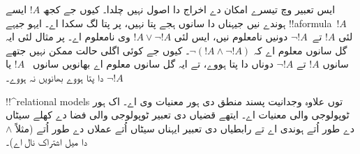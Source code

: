 \documentclass[../../../include/open-logic-section]{subfiles}
\begin{document}
ایس تعبیر وچ تیسرے امکان دے اخراج دا اصول نہیں چلدا۔ کیوں جے کجھ $!A$ ایسے
ہوندے نیں جیہناں دا سانوں ہجے پتا نہیں، پر پتا لگ سکدا اے۔ ایہو جیہے
!!a{formula}~$!A$ لئی $!A$ تے~$\lnot !A$ دونیں نامعلوم نیں، ایس لئی
$!A \lor \lnot !A$ وی نامعلوم اے۔ پر مثال لئی ایہ گل سانوں معلوم اے کہ
$\lnot(!A \land \lnot !A)$۔ کیوں جے کوئی اگلی حالت ممکن نہیں جتھے سانوں
$!A$ تے $\lnot !A$ دوناں دا پتا ہووے، تے ایہ گل سانوں معلوم اے بھانویں سانوں
~$!A$ یا $\lnot !A$ دا پتا ہووے بھانویں نہ ہووے۔

!!^{relational model}s توں علاوہ وجدانیت پسند منطق دی ہور معنیات وی اے۔
اک ہور ٹوپولوجی والی معنیات اے۔ ایتھے قضیاں دی تعبیر ٹوپولوجی والی فضا دے
کھلے سیٹاں دے طور اُتے ہوندی اے تے رابطیاں دی تعبیر ایہناں سیٹاں اُتے عملاں دے
طور اُتے (مثلاً $\land$ دا میل اشتراک نال اے)۔
\end{document}
